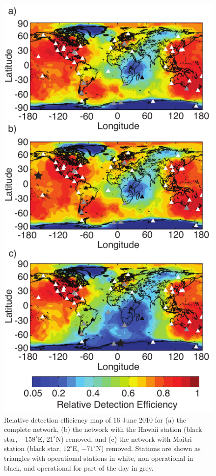 \begin{figure}[ht!]
   \centering
\noindent\includegraphics[scale=1]{efficiency/Figures/2012RS005049-p12.pdf}
   \caption{Relative detection efficiency map of 16 June 2010  for (a) the complete network, (b) the network with the Hawaii station (black star, $-158^\circ$E, $21^\circ$N) removed, and (c) the network with Maitri station (black star, $12^\circ$E, $-71^\circ$N) removed.
Stations are shown as triangles with operational stations in white, non operational in black, and operational for part of the day in grey.}
   \label{efficiency:fig:scrubMap}
\end{figure}

